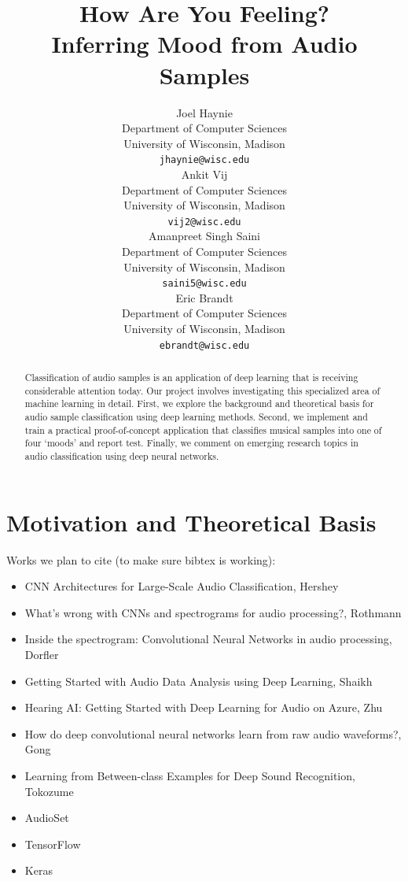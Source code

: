 \documentclass{article}
\title{How Are You Feeling? \\ Inferring Mood from Audio Samples}
\author{
  Joel Haynie \\
  Department of Computer Sciences\\
  University of Wisconsin, Madison\\
  \texttt{jhaynie@wisc.edu} \\
  \And
  Ankit Vij \\
  Department of Computer Sciences\\
  University of Wisconsin, Madison\\
  \texttt{vij2@wisc.edu} \\
  \AND
  Amanpreet Singh Saini \\
  Department of Computer Sciences\\
  University of Wisconsin, Madison\\
  \texttt{saini5@wisc.edu} \\
  \And
  Eric Brandt \\
  Department of Computer Sciences\\
  University of Wisconsin, Madison\\
  \texttt{ebrandt@wisc.edu}
}
\begin{document}

\maketitle

\begin{abstract}
Classification of audio samples is an application of deep learning that is receiving considerable attention today. Our project involves investigating this specialized area of machine learning in detail. First, we explore the background and theoretical basis for audio sample classification using deep learning methods. Second, we implement and train a practical proof-of-concept application that classifies musical samples into one of four ‘moods’ and report test. Finally, we comment on emerging research topics in audio classification using deep neural networks.
\end{abstract}

\section{Motivation and Theoretical Basis}\label{sec:theory}

Works we plan to cite (to make sure bibtex is working): 
\begin{itemize}
\item CNN Architectures for Large-Scale Audio Classification, Hershey\cite{hershey}
\item What’s wrong with CNNs and spectrograms for audio processing?, Rothmann\cite{rothmann}
\item Inside the spectrogram: Convolutional Neural Networks in audio processing, Dorfler\cite{dorfler}
\item Getting Started with Audio Data Analysis using Deep Learning, Shaikh\cite{shaikh}
\item Hearing AI: Getting Started with Deep Learning for Audio on Azure, Zhu\cite{zhu}
\item How do deep convolutional neural networks learn from raw audio waveforms?, Gong\cite{gong}
\item Learning from Between-class Examples for Deep Sound Recognition, Tokozume \cite{tokozume}
\item AudioSet \cite{audioset}
\item TensorFlow \cite{tensorflow}
\item Keras \cite{keras}
\end{itemize}
\end{document}
